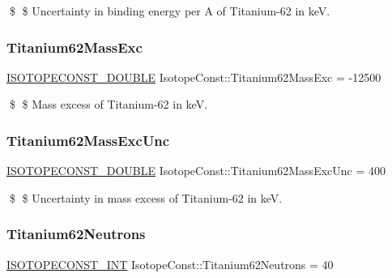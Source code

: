 \$ \$ Uncertainty in binding energy per A of Titanium-\/62 in keV. \mbox{\label{group___isotope_const-_titanium-_ti62_ga4434df557d92c1d1e924a2f01a9ae213}} 
\subsubsection{\texorpdfstring{Titanium62\+Mass\+Exc}{Titanium62MassExc}}
{\footnotesize\ttfamily \mbox{\hyperlink{group___isotope_const-_macros_ga8f45a7272ce02c0b4c65c44636ed719a}{I\+S\+O\+T\+O\+P\+E\+C\+O\+N\+S\+T\+\_\+\+D\+O\+U\+B\+LE}} Isotope\+Const\+::\+Titanium62\+Mass\+Exc = -\/12500}

\$ \$ Mass excess of Titanium-\/62 in keV. \mbox{\label{group___isotope_const-_titanium-_ti62_ga6db210ada3bc51db32dcd382b8beffda}} 
\subsubsection{\texorpdfstring{Titanium62\+Mass\+Exc\+Unc}{Titanium62MassExcUnc}}
{\footnotesize\ttfamily \mbox{\hyperlink{group___isotope_const-_macros_ga8f45a7272ce02c0b4c65c44636ed719a}{I\+S\+O\+T\+O\+P\+E\+C\+O\+N\+S\+T\+\_\+\+D\+O\+U\+B\+LE}} Isotope\+Const\+::\+Titanium62\+Mass\+Exc\+Unc = 400}

\$ \$ Uncertainty in mass excess of Titanium-\/62 in keV. \mbox{\label{group___isotope_const-_titanium-_ti62_gaa272b49ed5b6386db69465cd553dabc9}} 
\subsubsection{\texorpdfstring{Titanium62\+Neutrons}{Titanium62Neutrons}}
{\footnotesize\ttfamily \mbox{\hyperlink{group___isotope_const-_macros_ga5f18360b3e99483a35c32d789e62621c}{I\+S\+O\+T\+O\+P\+E\+C\+O\+N\+S\+T\+\_\+\+I\+NT}} Isotope\+Const\+::\+Titanium62\+Neutrons = 40}

